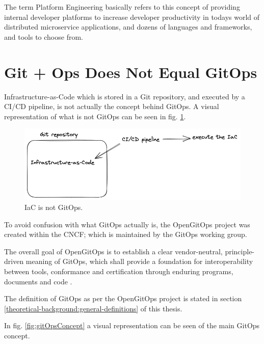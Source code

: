 The term Platform Engineering basically refers to this concept of
providing internal developer platforms to increase developer productivity
in todays world of distributed microservice applications,
and dozens of languages and frameworks,
and tools to choose from.






\section{Git + Ops Does Not Equal GitOps}

Infrastructure-as-Code which is stored in a Git repository,
and executed by a CI/CD pipeline,
is not actually the concept behind GitOps.
A visual representation of what is not GitOps can be seen in
fig. \ref{fig:iacIsNotGitOps}.

\begin{figure}[h]
	\centering
	\includegraphics[width=1.00\linewidth]{assets/iac-is-not-gitops.png}
	\caption{IaC is not GitOps.
	}
	\label{fig:iacIsNotGitOps}	
\end{figure}

To avoid confusion with what GitOps actually is, 
the OpenGitOps project
\autocite{openGitOpsProject}
was created within the CNCF;
which is maintained by the GitOps working group.

The overall goal of OpenGitOps is to establish a clear vendor-neutral,
principle-driven meaning of GitOps,
which shall provide a foundation for interoperability between tools, conformance and certification through enduring programs, documents and code
\autocite{opengitopsDocuments}.

The definition of GitOps as per the OpenGitOps project
is stated in section \ref{theoretical-background:general-definitions} of this thesis.

In fig. \ref{fig:gitOpsConcept} a visual representation can be seen of the main GitOps concept.

